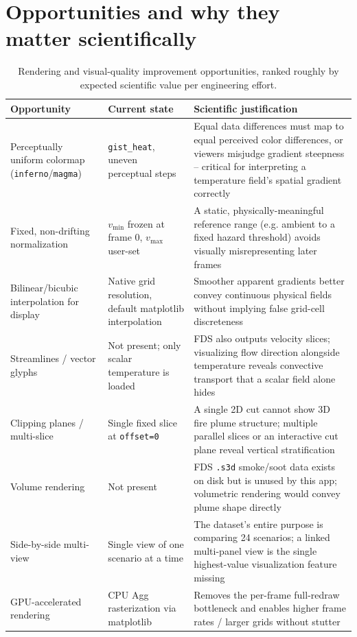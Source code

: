 \documentclass[11pt,a4paper]{report}
\begin{document}
\section{Opportunities and why they matter scientifically}
\begin{table}[h]
\centering
\small
\begin{tabular}{p{3.4cm}p{5.4cm}p{5.4cm}}
\toprule
\textbf{Opportunity} & \textbf{Current state} & \textbf{Scientific justification} \\
\midrule
Perceptually uniform colormap (\texttt{inferno}/\texttt{magma}) & \texttt{gist\_heat}, uneven perceptual steps & Equal data differences must map to equal perceived color differences, or viewers misjudge gradient steepness -- critical for interpreting a temperature field's spatial gradient correctly \\
Fixed, non-drifting normalization & $v_{\min}$ frozen at frame 0, $v_{\max}$ user-set & A static, physically-meaningful reference range (e.g. ambient to a fixed hazard threshold) avoids visually misrepresenting later frames \\
Bilinear/bicubic interpolation for display & Native grid resolution, default matplotlib interpolation & Smoother apparent gradients better convey continuous physical fields without implying false grid-cell discreteness \\
Streamlines / vector glyphs & Not present; only scalar temperature is loaded & FDS also outputs velocity slices; visualizing flow direction alongside temperature reveals convective transport that a scalar field alone hides \\
Clipping planes / multi-slice & Single fixed slice at \texttt{offset=0} & A single 2D cut cannot show 3D fire plume structure; multiple parallel slices or an interactive cut plane reveal vertical stratification \\
Volume rendering & Not present & FDS \texttt{.s3d} smoke/soot data exists on disk but is unused by this app; volumetric rendering would convey plume shape directly \\
Side-by-side multi-view & Single view of one scenario at a time & The dataset's entire purpose is comparing 24 scenarios; a linked multi-panel view is the single highest-value visualization feature missing \\
GPU-accelerated rendering & CPU Agg rasterization via matplotlib & Removes the per-frame full-redraw bottleneck and enables higher frame rates / larger grids without stutter \\
\bottomrule
\end{tabular}
\caption{Rendering and visual-quality improvement opportunities, ranked roughly by expected
scientific value per engineering effort.}
\end{table}
\end{document}
